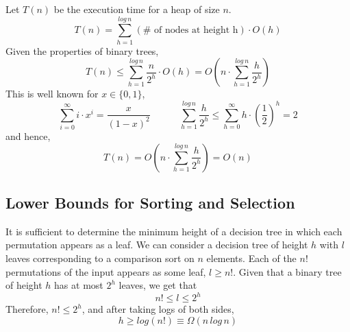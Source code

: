 \noindent{}


{Let \(T(n)\) be the execution time for a heap of size \(n\).
    \begin{equation}
        T(n) = \sum^{log\,n}_{h=1} (\# \text{ of nodes at height h}) \cdot O(h)
    \end{equation}
    Given the properties of binary trees, 
    \begin{equation}
        T(n) \leq \sum^{log\,n}_{h=1} \frac{n}{2^h} \cdot O(h) = O\left( n \cdot \sum^{log\,n}_{h=1} \frac{h}{2^h} \right)
    \end{equation}
    This is well known for \(x \in \{0,1\}\),
    \begin{equation}
        \sum^\infty_{i=0} i \cdot x^i = \frac{x}{(1-x)^2} \quad\quad\quad \sum^{log \, n}_{h=1} \frac{h}{2^h} \leq \sum^\infty_{h=0}h \cdot \left(\frac{1}{2}\right)^h = 2
    \end{equation}
    and hence,
    \begin{equation}
        T(n) = O \left(n \cdot \sum^{log \, n}_{h=1} \frac{h}{2^h}\right) = O(n)
    \end{equation}
}

\newpage\subsection{Lower Bounds for Sorting and Selection}

{It is sufficient to determine the minimum height of a decision tree in which each permutation appears as a leaf. 
We can consider a decision tree of height \(h\) with \(l\) leaves corresponding to a comparison sort on \(n\) elements. Each of the \(n!\) permutations of the input appears as some leaf, \(l \geq n!\). Given that a binary tree of height \(h\) has at most \(2^h\) leaves, we get that
\begin{equation}
    n! \leq l \leq 2^h
\end{equation}
Therefore, \(n! \leq 2^h\), and after taking logs of both sides,
\begin{equation}
    h \geq log(n!) \equiv \Omega(n\,log\,n)
\end{equation}}

